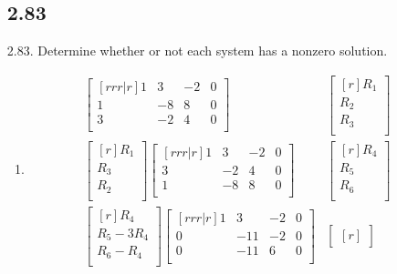 \documentclass{report}
\theoremstyle{plain}
\theoremstyle{definition}
\theoremstyle{plain}
\begin{document}
\begin{enumerate}
\subsection{2.83}
\item [2.83.] Determine whether or not each system has a nonzero solution.
	\begin{enumerate}
	\item
	\begin{align*}
	\begin{bmatrix}[rrr|r]
	1 & 3 & -2 & 0\\
	1 & -8 & 8 & 0\\
	3 & -2 & 4 & 0\\
	\end{bmatrix}&
	\begin{bmatrix}[r]
	R_1\\ R_2\\ R_3\\
	\end{bmatrix}\\
	\begin{bmatrix}[r]
	R_1\\ R_3\\ R_2\\
	\end{bmatrix}
	\begin{bmatrix}[rrr|r]
	1 & 3 & -2 & 0\\
	3 & -2 & 4 & 0\\
	1 & -8 & 8 & 0\\
	\end{bmatrix}&
	\begin{bmatrix}[r]
	R_4\\ R_5\\ R_6\\
	\end{bmatrix}\\
	\begin{bmatrix}[r]
	R_4\\
	R_5 - 3R_4\\
	R_6 - R_4\\
	\end{bmatrix}
	\begin{bmatrix}[rrr|r]
	1 & 3 & -2 & 0\\
	0 & -11 & -2 & 0\\
	0 & -11 & 6 & 0\\
	\end{bmatrix}&
	\begin{bmatrix}[r]

\end{bmatrix}
\end{align*}
\end{enumerate}
\end{enumerate}
\end{document}
